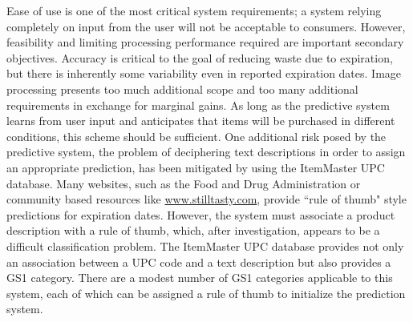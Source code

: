 \documentclass[11pt]{article} %
\begin{document}
\newline \quad \newline
Ease of use is one of the most critical system requirements; a system relying completely on input from the user will not be acceptable to consumers. However, feasibility and limiting processing performance required are important secondary objectives. Accuracy is critical to the goal of reducing waste due to expiration, but there is inherently some variability even in reported expiration dates. Image processing presents too much additional scope and too many additional requirements in exchange for marginal gains. As long as the predictive system learns from user input and anticipates that items will be purchased in different conditions, this scheme should be sufficient. One additional risk posed by the predictive system, the problem of deciphering text descriptions in order to assign an appropriate prediction, has been mitigated by using the ItemMaster UPC database. Many websites, such as the Food and Drug Administration or community based resources like \url{www.stilltasty.com}, provide ``rule of thumb" style predictions for expiration dates. However, the system must associate a product description with a rule of thumb, which, after investigation, appears to be a difficult classification problem. The ItemMaster UPC database provides not only an association between a UPC code and a text description but also provides a GS1 category. There are a modest number of GS1 categories applicable to this system, each of which can be assigned a rule of thumb to initialize the prediction system.
\newline \quad \newline
\end{document}
